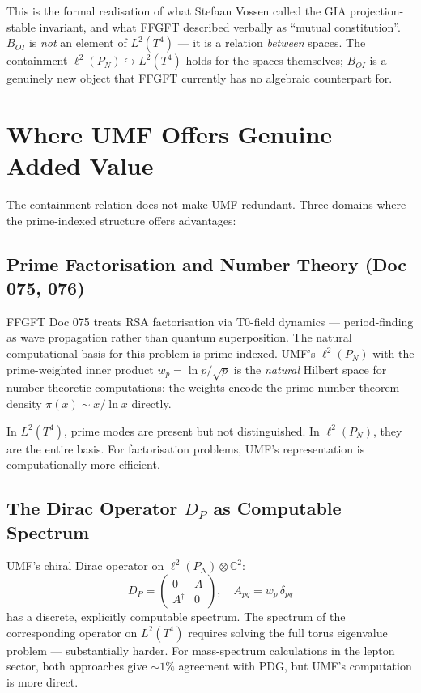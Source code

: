 This is the formal realisation of what Stefaan Vossen called the GIA
projection-stable invariant, and what FFGFT described verbally as
``mutual constitution''. $B_{OI}$ is \emph{not} an element of $L^2(T^4)$
— it is a relation \emph{between} spaces. The containment
$\ell^2(P_N) \hookrightarrow L^2(T^4)$ holds for the spaces themselves;
$B_{OI}$ is a genuinely new object that FFGFT currently has no algebraic
counterpart for.

\section{Where UMF Offers Genuine Added Value}

The containment relation does not make UMF redundant. Three domains where
the prime-indexed structure offers advantages:

\subsection{Prime Factorisation and Number Theory (Doc 075, 076)}

FFGFT Doc 075 treats RSA factorisation via T0-field dynamics — period-finding
as wave propagation rather than quantum superposition. The natural computational
basis for this problem is prime-indexed. UMF's $\ell^2(P_N)$ with the
prime-weighted inner product $w_p = \ln p/\sqrt{p}$ is the \emph{natural}
Hilbert space for number-theoretic computations: the weights encode the
prime number theorem density $\pi(x) \sim x/\ln x$ directly.

In $L^2(T^4)$, prime modes are present but not distinguished. In $\ell^2(P_N)$,
they are the entire basis. For factorisation problems, UMF's representation
is computationally more efficient.

\subsection{The Dirac Operator \texorpdfstring{$D_P$}{D\_P} as Computable Spectrum}

UMF's chiral Dirac operator on $\ell^2(P_N) \otimes \mathbb{C}^2$:
\begin{equation}
  D_P = \begin{pmatrix} 0 & A \\ A^\dagger & 0 \end{pmatrix},
  \quad A_{pq} = w_p\,\delta_{pq}
  \tag{244.5}
\end{equation}
has a discrete, explicitly computable spectrum. The spectrum of the
corresponding operator on $L^2(T^4)$ requires solving the full torus
eigenvalue problem — substantially harder. For mass-spectrum calculations
in the lepton sector, both approaches give $\sim 1\%$ agreement with PDG,
but UMF's computation is more direct.

